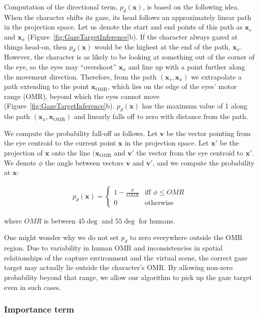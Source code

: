 Computation of the directional term, $p_d(\mathbf{x})$, is based on the following idea. When the character shifts its gaze, its head follows an approximately linear path in the projection space. Let us denote the start and end points of this path as $\mathbf{x}_s$ and $\mathbf{x}_x$ (Figure~\ref{fig:GazeTargetInference}b). If the character always gazed at things head-on, then $p_d(\mathbf{x})$ would be the highest at the end of the path, $\mathbf{x}_x$. However, the character is as likely to be looking at something out of the corner of the eye, so the eyes may ``overshoot'' $\mathbf{x}_x$ and line up with a point further along the movement direction. Therefore, from the path $(\mathbf{x}_s, \mathbf{x}_x)$ we extrapolate a path extending to the point $\mathbf{x}_{\mathrm{OMR}}$, which lies on the edge of the eyes' motor range (OMR), beyond which the eyes cannot move (Figure~\ref{fig:GazeTargetInference}b). $p_d(\mathbf{x})$ has the maximum value of 1 along the path $(\mathbf{x}_x, \mathbf{x}_{\mathrm{OMR}})$ and linearly falls off to zero with distance from the path.

We compute the probability fall-off as follows. Let $\mathbf{v}$ be the vector pointing from the eye centroid to the current point $\mathbf{x}$ in the projection space. Let $\mathbf{x}'$ be the projection of $\mathbf{x}$ onto the line $(\mathbf{x}_{\mathrm{OMR}}$ and $\mathbf{v}'$ the vector from the eye centroid to $\mathbf{x}'$. We denote $\phi$ the angle between vectors $\mathbf{v}$ and $\mathbf{v}'$, and we compute the probability at $\mathbf{x}$:

\begin{align} \label{eq:GazeDirectionProbability}
p_d(\mathbf{x}) =
\begin{cases}
1 - \frac{\phi}{OMR} & \text{iff } \phi \leq OMR \\
0 & \text{otherwise}
\end{cases}
\end{align}

where $OMR$ is between $45\deg$ and $55\deg$ for humans.

One might wonder why we do not set $p_d$ to zero everywhere outside the OMR region. Due to variability in human OMR and inconsistencies in spatial relationships of the capture environment and the virtual scene, the correct gaze target may actually lie outside the character's OMR. By allowing non-zero probability beyond that range, we allow our algorithm to pick up the gaze target even in such cases.

\subsubsection{Importance term}

